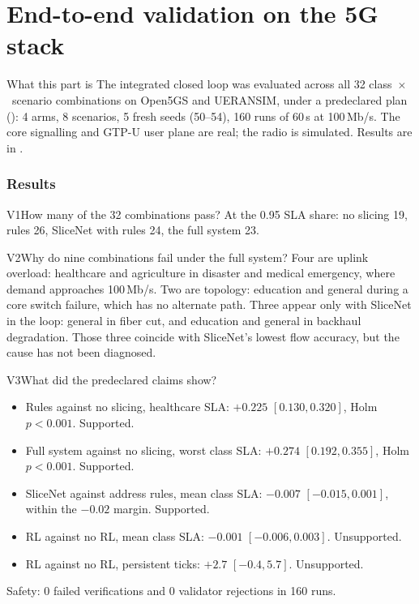 \part{End-to-end validation on the 5G stack}\label{part:v32}

\begin{keybox}{What this part is}
The integrated closed loop was evaluated across all 32 class~$\times$~scenario combinations on Open5GS and UERANSIM,
under a predeclared plan (): 4 arms, 8 scenarios, 5 fresh seeds (50--54),
160 runs of 60\,s at 100\,Mb/s. The core signalling and GTP-U user plane are real; the radio is simulated. Results
are in .
\end{keybox}

\section{Results}

\begin{qa}{V1}{How many of the 32 combinations pass?}
At the 0.95 SLA share: no slicing 19, rules 26, SliceNet with rules 24, the full system 23.
\end{qa}

\begin{qa}{V2}{Why do nine combinations fail under the full system?}
Four are uplink overload: healthcare and agriculture in disaster and medical emergency, where demand approaches
100\,Mb/s. Two are topology: education and general during a core switch failure, which has no alternate path. Three
appear only with SliceNet in the loop: general in fiber cut, and education and general in backhaul degradation. Those
three coincide with SliceNet's lowest flow accuracy, but the cause has not been diagnosed.
\end{qa}

\begin{qa}{V3}{What did the predeclared claims show?}
\begin{itemize}
\item Rules against no slicing, healthcare SLA: $+0.225$ $[0.130, 0.320]$, Holm $p<0.001$. Supported.
\item Full system against no slicing, worst class SLA: $+0.274$ $[0.192, 0.355]$, Holm $p<0.001$. Supported.
\item SliceNet against address rules, mean class SLA: $-0.007$ $[-0.015, 0.001]$, within the $-0.02$ margin.
  Supported.
\item RL against no RL, mean class SLA: $-0.001$ $[-0.006, 0.003]$. Unsupported.
\item RL against no RL, persistent ticks: $+2.7$ $[-0.4, 5.7]$. Unsupported.
\end{itemize}
Safety: 0 failed verifications and 0 validator rejections in 160 runs.
\end{qa}

